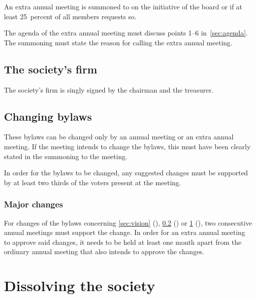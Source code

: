 \documentclass[a4paper]{article}
\begin{document}
An extra annual meeting is summoned to on the initiative of the
board or if at least 25~percent of all members requests so.

The agenda of the extra annual meeting must discuss points 1--6
in~\ref{sec:agenda}. The summoning must state the reason for calling the extra
annual meeting.


\subsection{The society's firm}

The society's firm is singly signed by the chairman and the
treasurer.


\subsection{Changing bylaws}
\label{sec:changingbylaws}

These bylaws can be changed only by an annual meeting or an extra annual
meeting. If the meeting intends to change the bylaws, this must have been
clearly stated in the summoning to the meeting.

In order for the bylaws to be changed, any suggested changes must be supported by
at least two thirds of the voters present at the meeting.

\subsubsection{Major changes}

For changes of the bylaws concerning \ref{sec:vision} (),
\ref{sec:changingbylaws} () or \ref{sec:dissolve}
(), two consecutive annual meetings must support the
change. In order for an extra annual meeting to approve said changes, it needs
to be held at least one month apart from the ordinary annual meeting that also
intends to approve the changes.


\section{Dissolving the society}
\label{sec:dissolve}
\end{document}
